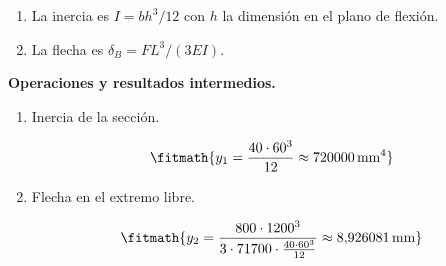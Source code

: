 \begin{enumerate}

\item La inercia es $I = b h^3/12$ con $h$ la dimensión en el plano de flexión.

\item La flecha es $\delta_B = F L^3/(3 E I)$.

\end{enumerate}

\noindent\textbf{Operaciones y resultados intermedios.}

\begin{enumerate}

\item Inercia de la sección.

\[\fitmath{y_{1}=\frac{40\cdot {60}^{3}}{12}\approx 720000\,\mathrm{mm^{4}}}\]

\item Flecha en el extremo libre.

\[\fitmath{y_{2}=\frac{800\cdot {1200}^{3}}{3\cdot 71700\cdot \frac{40\cdot {60}^{3}}{12}}\approx 8{,}926081\,\mathrm{mm}}\]

\end{enumerate}
